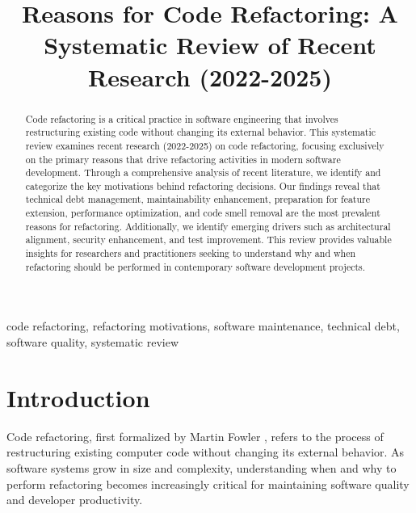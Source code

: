 \documentclass[journal,onecolumn]{IEEEtran}
\begin{document}
\title{Reasons for Code Refactoring: A Systematic Review of Recent Research (2022-2025)}

\author{
}

\maketitle

\pagestyle{fancy}
\fancyhf{} %
\fancyfoot[C]{\thepage} %
\renewcommand{\headrulewidth}{0.4pt}
\renewcommand{\footrulewidth}{0.4pt}

\begin{abstract}
Code refactoring is a critical practice in software engineering that involves restructuring existing code without changing its external behavior. This systematic review examines recent research (2022-2025) on code refactoring, focusing exclusively on the primary reasons that drive refactoring activities in modern software development. Through a comprehensive analysis of recent literature, we identify and categorize the key motivations behind refactoring decisions. Our findings reveal that technical debt management, maintainability enhancement, preparation for feature extension, performance optimization, and code smell removal are the most prevalent reasons for refactoring. Additionally, we identify emerging drivers such as architectural alignment, security enhancement, and test improvement. This review provides valuable insights for researchers and practitioners seeking to understand why and when refactoring should be performed in contemporary software development projects.
\end{abstract}

\begin{IEEEkeywords}
code refactoring, refactoring motivations, software maintenance, technical debt, software quality, systematic review
\end{IEEEkeywords}

\section{Introduction}
Code refactoring, first formalized by Martin Fowler \cite{fowler1999refactoring}, refers to the process of restructuring existing computer code without changing its external behavior. As software systems grow in size and complexity, understanding when and why to perform refactoring becomes increasingly critical for maintaining software quality and developer productivity.
\end{document}
